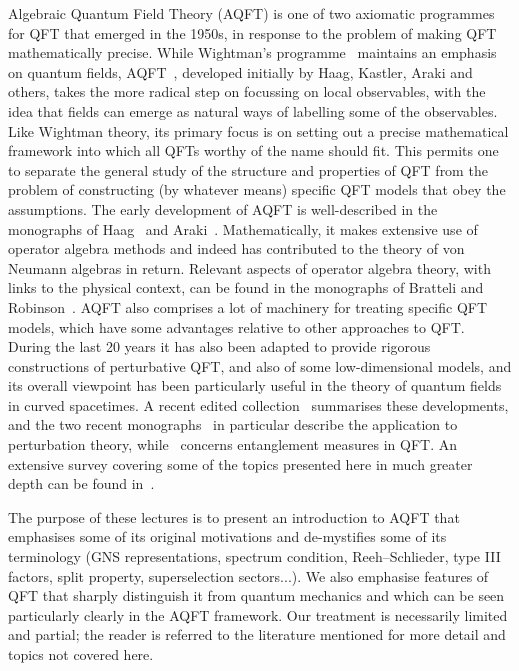 \documentclass[12pt,a4paper]{article}
\newcommand{\1}{\mathds{1}}                         %
\begin{document}
	Algebraic Quantum Field Theory (AQFT) is one of two axiomatic programmes for QFT that emerged in the 1950s, in response to the problem of making QFT mathematically precise.
	While Wightman's programme~\cite{StreaterWightman} maintains an emphasis on quantum fields, AQFT~\cite{Haag,Araki}, developed initially by Haag, Kastler, Araki and others, takes the more radical step on focussing on local observables, with the idea that fields can emerge as natural ways of labelling some of the observables. Like Wightman theory, its primary focus is on setting out a precise mathematical framework into which all QFTs worthy of the name should fit. This permits one to separate the general study of the structure and properties of QFT from the problem of constructing (by whatever means) specific QFT models that obey the assumptions. 
	The early development of AQFT is well-described in the monographs of Haag~\cite{Haag} and Araki~\cite{Araki}. Mathematically, it makes extensive use of operator algebra methods and indeed has contributed to the theory of von Neumann algebras in return. Relevant aspects of operator algebra theory, with links to the physical context, can be found in the monographs of Bratteli and Robinson~\cite{BratRob:vol1,BratRob:vol2}.
	AQFT also comprises a lot of machinery for treating specific QFT models, which have some advantages relative to other approaches to QFT. 
	During the last 20 years it has also been adapted to provide rigorous constructions of perturbative QFT, and also of some low-dimensional models, and its overall viewpoint
	has been particularly useful in the theory of quantum fields in curved spacetimes. A recent edited collection~\cite{AdvAQFT} summarises these developments, and the two recent monographs~\cite{Rejzner_book,duetsch2019classical} in particular describe the application to perturbation theory, while~\cite{hollands2018entanglement} concerns entanglement measures in QFT. An extensive survey covering some of the topics presented here in much greater depth can be found in~\cite{HalvorsenMueger:2006}.
	
	The purpose of these lectures is to present an introduction to AQFT
	that emphasises some of its original motivations and de-mystifies some of its terminology (GNS representations, spectrum condition, Reeh--Schlieder, type III factors, split property, superselection sectors...). We also emphasise features of QFT that sharply distinguish it from quantum mechanics and which can be seen particularly clearly in the AQFT framework. Our treatment is necessarily limited and partial; the reader is referred to the literature mentioned for more detail and topics not covered here. 
	
\end{document}
